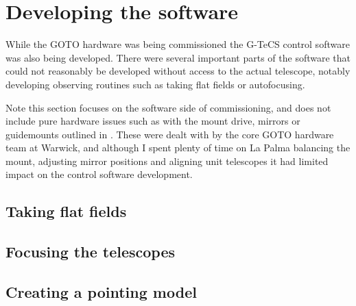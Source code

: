 \section{Developing the software}
\label{sec:software_commissioning}
\begin{colsection}


\begin{colsection}

While the GOTO hardware was being commissioned the G-TeCS control software was also being developed. There were several important parts of the software that could not reasonably be developed without access to the actual telescope, notably developing observing routines such as taking flat fields or autofocusing.

Note this section focuses on the software side of commissioning, and does not include pure hardware issues such as with the mount drive, mirrors or guidemounts outlined in . These were dealt with by the core GOTO hardware team at Warwick, and although I spent plenty of time on La Palma balancing the mount, adjusting mirror positions and aligning unit telescopes it had limited impact on the control software development.

\end{colsection}


\subsection{Taking flat fields}
\label{sec:flats}
\begin{colsection}

\citep{flats}

\end{colsection}

\newpage
\subsection{Focusing the telescopes}
\label{sec:autofocus}
\begin{colsection}

\citep{autofocus}

\end{colsection}

\newpage
\subsection{Creating a pointing model}
\label{sec:pointxp}
\begin{colsection}


\end{colsection}
\end{colsection}
